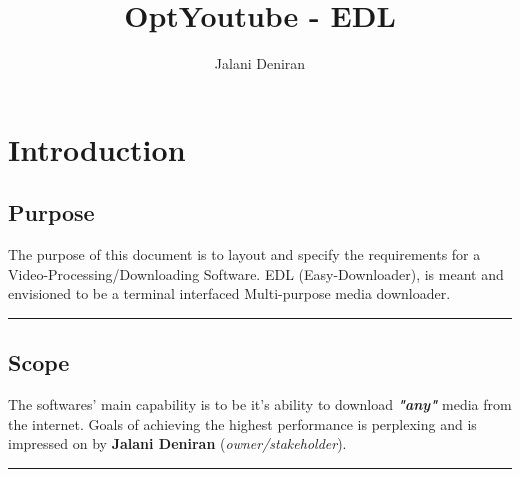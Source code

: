 \documentclass{article}
\title{OptYoutube - EDL}
\author{Jalani Deniran}
\begin{document}
\maketitle

\section{Introduction}
\subsection{Purpose}
\raggedright
The purpose of this document is to layout and specify the requirements for a Video-Processing/Downloading Software. EDL (Easy-Downloader), is meant and envisioned to be a terminal interfaced Multi-purpose media downloader.
\noindent\rule{\textwidth}{1pt}
\subsection{Scope}
\raggedright
The softwares' main capability is to be it's ability to download \textbf{\textit{"any"}} media from the internet. Goals of achieving the highest performance is perplexing and is impressed on by \textbf{Jalani Deniran} (\textit{owner/stakeholder}).
\noindent\rule{\textwidth}{1pt}
\end{document}
